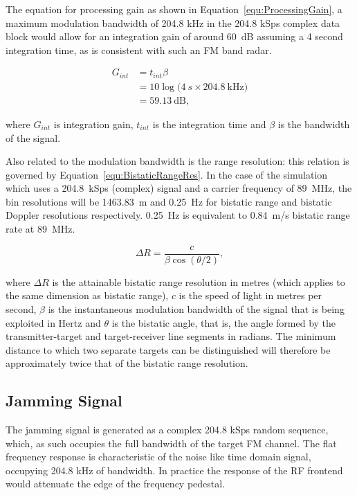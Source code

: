 \documentclass[conference]{IEEEtran}
\begin{document}
The equation for processing gain as shown in Equation~\ref{equ:ProcessingGain}, a maximum modulation bandwidth of 204.8 kHz in the 204.8 kSps complex data block would allow for an integration gain of around 60~dB assuming a 4 second integration time, as is consistent with such an FM band radar.

\begin{align}\label{equ:ProcessingGain}
G_{int} & = t_{int}  \beta\\
	    & = 10 \log{\bigg(4~s  \times 204.8~\mathrm{kHz}\bigg)}\\
	    & = 59.13~\mathrm{dB} ,
\end{align}

where $G_{int}$ is integration gain, $t_{int}$ is the integration time and $\beta$ is the bandwidth of the signal.

Also related to the modulation bandwidth is the range resolution: this relation is governed by Equation~\ref{equ:BistaticRangeRes}. In the case of the simulation which uses a 204.8~kSps (complex) signal and a carrier frequency of 89~MHz, the bin resolutions will be 1463.83~m and 0.25~Hz for bistatic range and bistatic Doppler resolutions respectively. 0.25~Hz is equivalent to 0.84~m/s bistatic range rate at 89~MHz.

\begin{equation}\label{equ:BistaticRangeRes}
\Delta R = \frac{c}{\beta \cos{  (\theta / 2 )}} ,
\end{equation}

where $\Delta R$ is the attainable bistatic range resolution in metres (which applies to the same dimension as bistatic range), $c$ is the speed of light in metres per second, $\beta$ is the instantaneous modulation bandwidth of the signal that is being exploited in Hertz and $\theta$ is the bistatic angle, that is, the angle formed by the transmitter-target and target-receiver line segments in radians. The minimum distance to which two separate targets can be distinguished will therefore be approximately twice that of the bistatic range resolution.


\subsection{Jamming Signal}

The jamming signal is generated as a complex 204.8 kSps random sequence, which, as such occupies the full bandwidth of the target FM channel.  The flat frequency response is characteristic of the noise like time domain signal, occupying 204.8 kHz of bandwidth. In practice the response of the RF frontend would attenuate the edge of the frequency pedestal.
\end{document}
